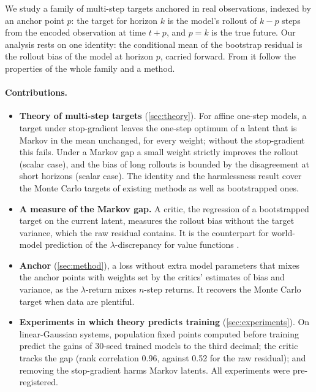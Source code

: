 We study a family of multi-step targets anchored in real observations, indexed by an anchor point $p$: the target for horizon $k$ is the model's rollout of $k - p$ steps from the encoded observation at time $t + p$, and $p = k$ is the true future. Our analysis rests on one identity: the conditional mean of the bootstrap residual is the rollout bias of the model at horizon $p$, carried forward. From it follow the properties of the whole family and a method.

\paragraph{Contributions.}
\begin{itemize}
  \item \textbf{Theory of multi-step targets} (\cref{sec:theory}). For affine one-step models, a target under stop-gradient leaves the one-step optimum of a latent that is Markov in the mean unchanged, for every weight; without the stop-gradient this fails. Under a Markov gap a small weight strictly improves the rollout (scalar case), and the bias of long rollouts is bounded by the disagreement at short horizons (scalar case). The identity and the harmlessness result cover the Monte Carlo targets of existing methods as well as bootstrapped ones.
  \item \textbf{A measure of the Markov gap.} A critic, the regression of a bootstrapped target on the current latent, measures the rollout bias without the target variance, which the raw residual contains. It is the counterpart for world-model prediction of the $\lambda$-discrepancy for value functions \citep{allen2024lambda}.
  \item \textbf{Anchor} (\cref{sec:method}), a loss without extra model parameters that mixes the anchor points with weights set by the critics' estimates of bias and variance, as the $\lambda$-return mixes $n$-step returns. It recovers the Monte Carlo target when data are plentiful.
  \item \textbf{Experiments in which theory predicts training} (\cref{sec:experiments}). On linear-Gaussian systems, population fixed points computed before training predict the gains of 30-seed trained models to the third decimal; the critic tracks the gap (rank correlation 0.96, against 0.52 for the raw residual); and removing the stop-gradient harms Markov latents. All experiments were pre-registered. 
\end{itemize}
